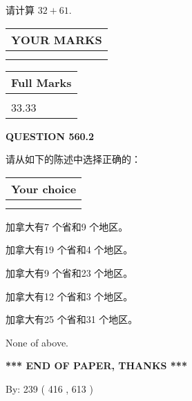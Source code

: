 \documentclass{ctexart}
\begin{document}
  
 
请计算 $ %
32 +  %
61 $.
 

 

 
  
\vspace{0.2in}
  
\noindent\begin{tabular}{|l|}
\hline
 YOUR MARKS  \\
\hline
 \\ 
 \\ 
\hline
\end{tabular}
\hspace{0.05in} \begin{tabular}{|l|}
\hline
 Full Marks  \\
\hline
 \\ 
33.33 \\
\hline
\end{tabular}
{\textbf{\Large{QUESTION
560.2 
}}}
  
  
请从如下的陈述中选择正确的：
  
  
\noindent\hspace{3.0in} \begin{tabular}{|l|}
\hline
Your choice \\
\hline
 \\ 
 \\ 
\hline
\end{tabular}
  
  
 
 
加拿大有7 个省和9 个地区。
 
 
加拿大有19 个省和4 个地区。
 
 
加拿大有9 个省和23 个地区。
 
 
加拿大有12 个省和3 个地区。
 
 
加拿大有25 个省和31 个地区。
 
 
 None of above.
 
 
   
   
 \vspace{0.2in}
 
   
   
   
   
\vspace{1.0in} 
{\textbf{\large{ *** END OF PAPER, THANKS *** }}} 
   
   
\hspace{1.0in} By: 
 239 ( 416 ,  613 )
   
\end{document}
